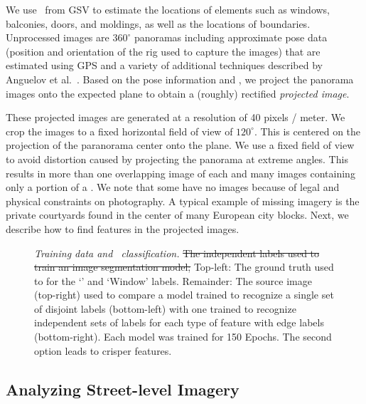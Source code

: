 We use \streetI\ from \acf{GSV} to estimate the locations of \facade elements such as windows, balconies, doors, and moldings, as well as the locations of \facade boundaries. 
Unprocessed \GSV images are $360^\circ$ panoramas including approximate pose data (position and orientation of the rig used to capture the images) that are estimated using GPS and a variety of additional techniques described by Anguelov et al.~. 
Based on the \GSV pose information and \GISds, we project the \GSV panorama images onto the expected \facade plane to obtain a (roughly) rectified {\em projected image}. 

These projected images are generated at a resolution of 40 pixels / meter. We crop the images to a fixed horizontal field of view of $120^\circ$. This is centered on the projection of the paranorama center onto the \facade plane. We use a fixed field of view  to avoid distortion caused by projecting the panorama at extreme angles. This results in  more than one overlapping image of each \facade and many images containing only a portion of a \facade. We note that some \facades have no \GSV images because of legal and physical constraints on photography. A typical example of missing imagery is the private courtyards found in the center of many European city blocks. Next, we describe how to find \facade features in the projected images.










\begin{figure}[t!]
  \def\svgwidth{\columnwidth}  
    
\caption{{\it Training data and \facade\ classification.}\sout{ The independent labels used to train an image segmentation model;} Top-left: The ground truth used to for the `\Facade' and `Window' labels. Remainder: The source image (top-right) used to compare a model trained to recognize a single set of disjoint labels (bottom-left) with one trained to recognize independent sets of labels for each type of feature with edge labels (bottom-right). Each model was trained for 150 Epochs. The second option leads to crisper features.}
\label{fig:edge-compare}
\end{figure}


\subsection{Analyzing Street-level Imagery}
\label{sec:cnns}

